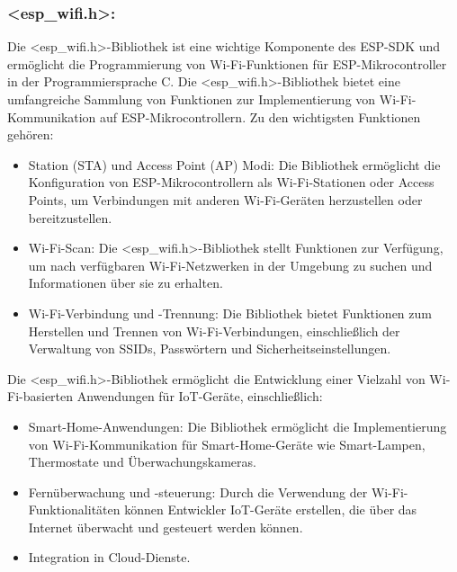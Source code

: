 \newpage
\subsubsection*{<esp\_wifi.h>:}

Die <esp\_wifi.h>-Bibliothek ist eine wichtige Komponente des ESP-SDK und ermöglicht die Programmierung von Wi-Fi-Funktionen für ESP-Mikrocontroller in der Programmiersprache C. Die <esp\_wifi.h>-Bibliothek 
bietet eine umfangreiche Sammlung von Funktionen zur Implementierung von Wi-Fi-Kommunikation auf ESP-Mikrocontrollern. 
Zu den wichtigsten Funktionen gehören:

\begin{itemize}
    \item Station (STA) und Access Point (AP) Modi: Die Bibliothek ermöglicht die Konfiguration von ESP-Mikrocontrollern als Wi-Fi-Stationen oder Access Points, um Verbindungen mit anderen Wi-Fi-Geräten herzustellen oder bereitzustellen.
    \item Wi-Fi-Scan: Die <esp\_wifi.h>-Bibliothek stellt Funktionen zur Verfügung, um nach verfügbaren Wi-Fi-Netzwerken in der Umgebung zu suchen und Informationen über sie zu erhalten.
    \item Wi-Fi-Verbindung und -Trennung: Die Bibliothek bietet Funktionen zum Herstellen und Trennen von Wi-Fi-Verbindungen, einschließlich der Verwaltung von SSIDs, Passwörtern und Sicherheitseinstellungen.
\end{itemize}

Die <esp\_wifi.h>-Bibliothek ermöglicht die Entwicklung einer Vielzahl von Wi-Fi-basierten Anwendungen für IoT-Geräte, einschließlich:

\begin{itemize}
    \item Smart-Home-Anwendungen: Die Bibliothek ermöglicht die Implementierung von Wi-Fi-Kommunikation für Smart-Home-Geräte wie Smart-Lampen, Thermostate und Überwachungskameras.
    \item Fernüberwachung und -steuerung: Durch die Verwendung der Wi-Fi-Funktionalitäten können Entwickler IoT-Geräte erstellen, die über das Internet überwacht und gesteuert werden können.
    \item Integration in Cloud-Dienste.
\end{itemize}

\newpage
